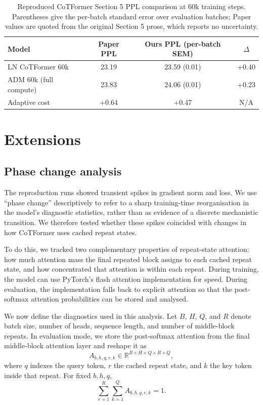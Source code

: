 \documentclass[10pt]{article}
\begin{document}
\begin{table}[!ht]
\centering
\small
\begin{tabular}{lccc}
\toprule
\textbf{Model} & \textbf{Paper PPL} & \textbf{Ours PPL (per-batch SEM)} & $\Delta$ \\ \midrule
LN CoTFormer 60k & 23.19 & 23.59 (0.01) & +0.40 \\
ADM 60k (full compute) & 23.83 & 24.06 (0.01) & +0.23 \\ \midrule
Adaptive cost & +0.64 & +0.47 & N/A \\ \bottomrule
\end{tabular}
\caption{Reproduced CoTFormer Section 5 PPL \citep{cotformer} comparison at 60k training steps. Parentheses give the per-batch standard error over evaluation batches; Paper values are quoted from the original Section 5 prose, which reports no uncertainty.}
\label{tab:section5-pair}
\end{table}
\section{Extensions}
\subsection{Phase change analysis} \label{subsec:phase-change}

The reproduction runs showed transient spikes in gradient norm and loss. We use
``phase change'' descriptively to refer to a sharp training-time reorganisation
in the model's diagnostic statistics, rather than as evidence of a discrete
mechanistic transition. We therefore tested whether these spikes coincided with
changes in how CoTFormer uses cached repeat states.

To do this, we tracked two complementary properties of repeat-state attention:
how much attention mass the final repeated block assigns to each cached repeat
state, and how concentrated that attention is within each repeat. During
training, the model can use PyTorch's flash attention implementation for speed.
During evaluation, the implementation falls back to explicit attention so that
the post-softmax attention probabilities can be stored and analysed.

We now define the diagnostics used in this analysis. Let \(B\), \(H\), \(Q\),
and \(R\) denote batch size, number of heads, sequence length, and number of
middle-block repeats. In evaluation mode, we store the post-softmax attention
from the final middle-block attention layer and reshape it as
\[
    A_{b,h,q,r,k}
    \in
    \mathbb{R}^{B \times H \times Q \times R \times Q},
\]
where \(q\) indexes the query token, \(r\) the cached repeat state, and \(k\)
the key token inside that repeat. For fixed \(b,h,q\),
\[
    \sum_{r=1}^{R}\sum_{k=1}^{Q} A_{b,h,q,r,k}=1.
\]
\end{document}
